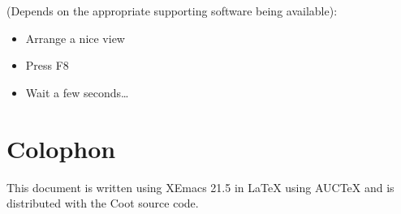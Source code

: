 \documentclass{article}
\begin{document}
(Depends on the appropriate supporting software being available):

\begin{itemize}
\item Arrange a nice view
\item Press F8
\item Wait a few seconds\ldots
\end{itemize}


\section*{Colophon}

This document is written using XEmacs 21.5 in \LaTeX{} using AUC\TeX{}
and is distributed with the Coot source code.
\end{document}
